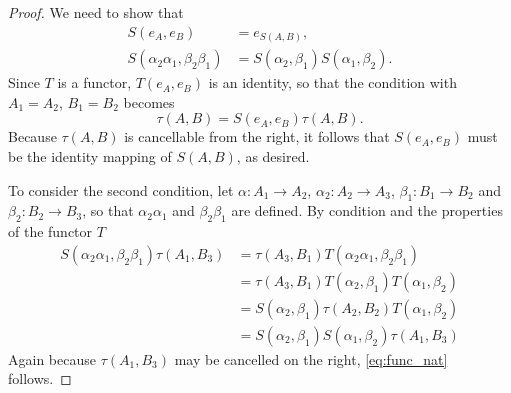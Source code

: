 \documentclass[11pt,a4paper]{report}
\begin{document}
\begin{proof}
	We need to show that
	\begin{align}
		S(e_A,e_B)&=e_{S(A,B)},\label{eq:func_id}\\
		S(\alpha_2\alpha_1,\beta_2\beta_1)&=S(\alpha_2,\beta_1)S(\alpha_1,\beta_2).\label{eq:func_nat}
	\end{align}
	Since $T$ is a functor, $T(e_A,e_B)$ is an identity, so that the condition  with
	$A_1=A_2$, $B_1=B_2$ becomes
	\begin{equation*}
		\tau(A,B)=S(e_A,e_B)\tau(A,B).
	\end{equation*}
	Because $\tau(A,B)$ is cancellable from the right, it follows that $S(e_A,e_B)$ must be the identity
	mapping of $S(A,B)$, as desired.

	To consider the second condition, let $\alpha:A_1\rightarrow A_2$, $\alpha_2:A_2\rightarrow A_3$,
	$\beta_1:B_1\rightarrow B_2$ and $\beta_2:B_2\rightarrow B_3$, so that $\alpha_2\alpha_1$ and
	$\beta_2\beta_1$ are defined. By condition  and the properties of the
	functor $T$
	\begin{align*}
		S(\alpha_2\alpha_1,\beta_2\beta_1)\tau(A_1,B_3) & = \tau(A_3,B_1)T(\alpha_2\alpha_1,\beta_2\beta_1)\\
				& = \tau(A_3,B_1)T(\alpha_2,\beta_1)T(\alpha_1,\beta_2)\\
				& = S(\alpha_2,\beta_1)\tau(A_2,B_2)T(\alpha_1,\beta_2)\\
				& = S(\alpha_2,\beta_1)S(\alpha_1,\beta_2)\tau(A_1,B_3)
	\end{align*}
	Again because $\tau(A_1,B_3)$ may be cancelled on the right, \cref{eq:func_nat} follows.
\end{proof}
\end{document}
